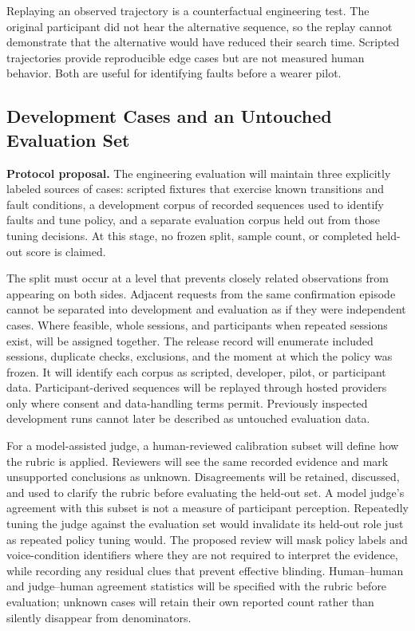 Replaying an observed trajectory is a counterfactual engineering test. The original participant did not hear the alternative sequence, so the replay cannot demonstrate that the alternative would have reduced their search time. Scripted trajectories provide reproducible edge cases but are not measured human behavior. Both are useful for identifying faults before a wearer pilot.


\subsection{Development Cases and an Untouched Evaluation Set}
\textbf{Protocol proposal.} The engineering evaluation will maintain three explicitly labeled sources of cases: scripted fixtures that exercise known transitions and fault conditions, a development corpus of recorded sequences used to identify faults and tune policy, and a separate evaluation corpus held out from those tuning decisions. At this stage, no frozen split, sample count, or completed held-out score is claimed.

The split must occur at a level that prevents closely related observations from appearing on both sides. Adjacent requests from the same confirmation episode cannot be separated into development and evaluation as if they were independent cases. Where feasible, whole sessions, and participants when repeated sessions exist, will be assigned together. The release record will enumerate included sessions, duplicate checks, exclusions, and the moment at which the policy was frozen. It will identify each corpus as scripted, developer, pilot, or participant data. Participant-derived sequences will be replayed through hosted providers only where consent and data-handling terms permit. Previously inspected development runs cannot later be described as untouched evaluation data.

For a model-assisted judge, a human-reviewed calibration subset will define how the rubric is applied. Reviewers will see the same recorded evidence and mark unsupported conclusions as unknown. Disagreements will be retained, discussed, and used to clarify the rubric before evaluating the held-out set. A model judge's agreement with this subset is not a measure of participant perception. Repeatedly tuning the judge against the evaluation set would invalidate its held-out role just as repeated policy tuning would. The proposed review will mask policy labels and voice-condition identifiers where they are not required to interpret the evidence, while recording any residual clues that prevent effective blinding. Human--human and judge--human agreement statistics will be specified with the rubric before evaluation; unknown cases will retain their own reported count rather than silently disappear from denominators.

